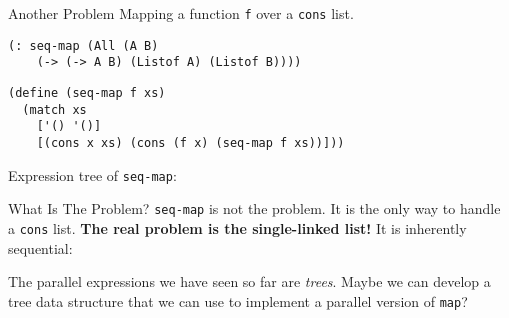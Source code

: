 \documentclass{beamer}
\begin{document}
\begin{frame}[fragile]{Another Problem}
Mapping a function \lstinline{f} over a \lstinline{cons} list.

\begin{lstlisting}
(: seq-map (All (A B)
    (-> (-> A B) (Listof A) (Listof B))))
\end{lstlisting}
\pause{}
\begin{lstlisting}
(define (seq-map f xs)
  (match xs
    ['() '()]
    [(cons x xs) (cons (f x) (seq-map f xs))]))
\end{lstlisting}

\pause{} \vspace{.5cm}

Expression tree of \lstinline{seq-map}:

  \begin{center}
  \end{center}
\end{frame}

\begin{frame}{What Is The Problem?}
  \lstinline{seq-map} is not the problem. It is the only way to handle a \lstinline{cons} list. \textbf{The real problem is the single-linked list!} It is inherently sequential:

\pause{} \vspace{0.5cm}

\begin{center}
\end{center}

\pause{} \vspace{0.5cm}

The parallel expressions we have seen so far are \emph{trees}. Maybe we can develop a tree data structure that we can use to implement a parallel version of \lstinline{map}?
\end{frame}
\end{document}
